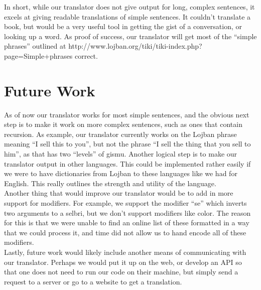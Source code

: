 \documentclass[11pt,letterpaper]{article}
\begin{document}
In short, while our translator does not give output for long, complex sentences, it excels at giving readable translations of simple sentences.  It couldn’t translate a book, but would be a very useful tool in getting the gist of a conversation, or looking up a word.  As proof of success, our translator will get most of the “simple phrases” outlined at http://www.lojban.org/tiki/tiki-index.php?page=Simple+phrases correct.  \\

\section{Future Work} 
As of now our translator works for most simple sentences, and the obvious next step is to make it work on more complex sentences, such as ones that contain recursion.  As example, our translator currently works on the Lojban phrase meaning “I sell this to you”, but not the phrase “I sell the thing that you sell to him”, as that has two “levels” of gismu.  Another logical step is to make our translator output in other languages.  This could be implemented rather easily if we were to have dictionaries from Lojban to these languages like we had for English.  This really outlines the strength and utility of the language.  \\
	Another thing that would improve our translator would be to add in more support for modifiers.  For example, we support the modifier “se” which inverts two arguments to a selbri, but we don’t support modifiers like color.  The reason for this is that we were unable to find an online list of these formatted in a way that we could process it, and time did not allow us to hand encode all of these modifiers.  \\
	Lastly, future work would likely include another means of communicating with our translator.  Perhaps we would put it up on the web, or develop an API so that one does not need to run our code on their machine, but simply send a request to a server or go to a website to get a translation.  \\\\\\\\\\\\\\\\\\\\\\\\\\\\\\\\\\\\
\end{document}
